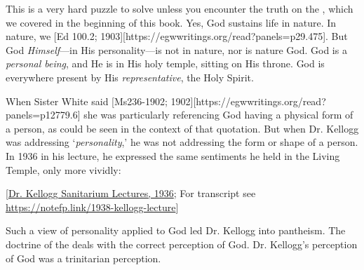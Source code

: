 This is a very hard puzzle to solve unless you encounter the truth on the , which we covered in the beginning of this book. Yes, God sustains life in nature. In nature, we [Ed 100.2; 1903][https://egwwritings.org/read?panels=p29.475]. But God \textit{Himself}—in His personality—is not in nature, nor is nature God. God is a \textit{personal being}, and He is in His holy temple, sitting on His throne. God is everywhere present by His \textit{representative}, the Holy Spirit.

When Sister White said [Ms236-1902; 1902][https://egwwritings.org/read?panels=p12779.6] she was particularly referencing God having a physical form of a person, as could be seen in the context of that quotation. But when Dr. Kellogg was addressing ‘\textit{personality},’ he was not addressing the form or shape of a person. In 1936 in his lecture, he expressed the same sentiments he held in the Living Temple, only more vividly:


[\href{https://forgotten-pillar.s3.us-east-2.amazonaws.com/Sanitarium+Lecture+1936.pdf}{Dr. Kellogg Sanitarium Lectures, 1936}; For transcript see \href{https://notefp.link/1938-kellogg-lecture}{https://notefp.link/1938-kellogg-lecture}]

Such a view of personality applied to God led Dr. Kellogg into pantheism. The doctrine of the  deals with the correct perception of God. Dr. Kellogg's perception of God was a trinitarian perception.


